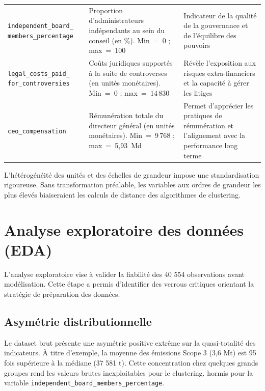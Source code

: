 \begin{longtable}{>{\raggedright\arraybackslash}p{}
                  >{\raggedright\arraybackslash}p{}
                  >{\raggedright\arraybackslash}p{}}
\midrule

\multicolumn{3}{l}{\textbf{Pilier Gouvernance (G)}} \\
\midrule

\texttt{independent\_board\_} \newline \texttt{members\_percentage}
& Proportion d'administrateurs indépendants au sein du conseil (en \%). Min~=~0 ; max~=~100
& Indicateur de la qualité de la gouvernance et de l'équilibre des pouvoirs \\
\midrule
\texttt{legal\_costs\_paid\_} \newline \texttt{for\_controversies}
& Coûts juridiques supportés à la suite de controverses (en unités monétaires). Min~=~0 ; max~=~14\,830
& Révèle l'exposition aux risques extra-financiers et la capacité à gérer les litiges \\
\midrule
\texttt{ceo\_compensation} & Rémunération totale du directeur général (en unités monétaires). Min~=~9\,768 ; max~=~5,93~Md & Permet d'apprécier les pratiques de rémunération et l'alignement avec la performance long terme \\

\end{longtable}

L'hétérogénéité des unités et des échelles de grandeur impose une standardisation rigoureuse. Sans transformation préalable, les variables aux ordres de grandeur les plus élevés biaiseraient les calculs de distance des algorithmes de clustering.

\section{Analyse exploratoire des données (EDA)}

L’analyse exploratoire vise à valider la fiabilité des 40 554 observations avant modélisation. Cette étape a permis d'identifier des verrous critiques orientant la stratégie de préparation des données.

\subsection{Asymétrie distributionnelle}

Le dataset brut présente une asymétrie positive extrême sur la quasi-totalité des indicateurs. À titre d'exemple, la moyenne des émissions Scope 3 (3,6 Mt) est 95 fois supérieure à la médiane (37 581 t). Cette concentration chez quelques grands groupes rend les valeurs brutes inexploitables pour le clustering. hormis pour la variable \texttt{independent\_board\_members\_percentage}.

